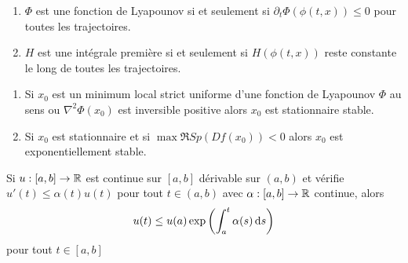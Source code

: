 \documentclass{cours}
\begin{document}
\begin{lemma}
    \begin{enumerate}
        \item $\Phi$ est une fonction de Lyapounov si et seulement si $\partial_{t} \Phi(\phi(t, x)) \leq 0$ pour toutes les trajectoires. 
        \item $H$ est une intégrale première si et seulement si $H(\phi(t, x))$ reste constante le long de toutes les trajectoires. 
    \end{enumerate}
\end{lemma}

\begin{theorem}
    \begin{enumerate}
        \item Si $x_{0}$ est un minimum local strict uniforme d'une fonction de Lyapounov $\Phi$ au sens ou $\nabla^{2}\Phi (x_{0})$ est inversible positive alors $x_{0}$ est stationnaire stable.
        \item Si $x_{0}$ est stationnaire et si $\max \mathfrak{R} Sp(Df(x_{0})) < 0$ alors $x_{0}$ est exponentiellement stable. 
    \end{enumerate}
\end{theorem}

\begin{lemma}
    Si $u : \left[a, b\right] \to \mathbb{R}$ est continue sur $\left[a, b\right]$ dérivable sur $(a, b)$ et vérifie $u'(t) \leq \alpha(t)u(t)$ pour tout $t\in (a, b)$ avec $\alpha : \left[a, b\right] \to \mathbb{R}$ continue, alors 
    \[
        u(t) \leq u(a)\exp\left(\int_{a}^{t}\alpha(s){\rm \, d} s\right)
    \]
    pour tout $t \in \left[a, b\right]$
\end{lemma}
\end{document}
